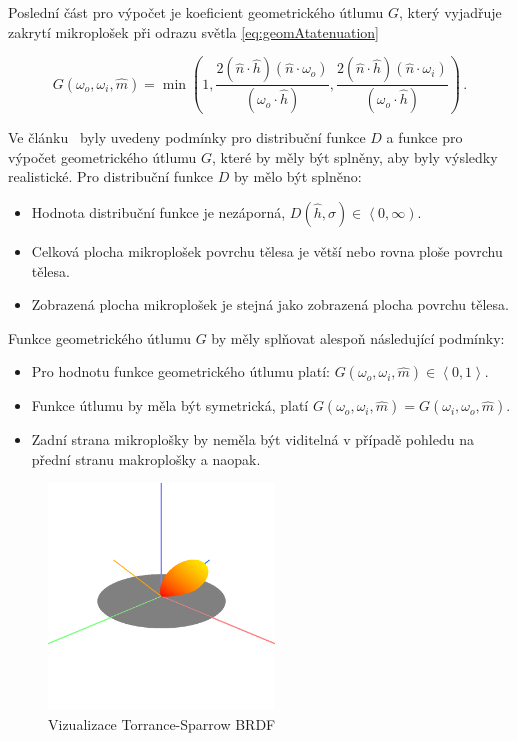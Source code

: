 \documentclass[czech,master]{diploma}
\newcommand{\intervalcc}[2]{\left<{{#1},{#2}}\right>}
\newcommand{\intervalco}[2]{\left<{{#1},{#2}}\right)}
\newcommand{\uvec}[1]{\hat{#1}}
\newcommand{\normVec}{\uvec{n}}
\newcommand{\normMicroVec}{\uvec{m}}
\newcommand{\inVec}{\omega_{i}}
\newcommand{\outVec}{\omega_{o}}
\newcommand{\halfVec}{\uvec{h}}
\newcommand{\rough}{\sigma}
\begin{document}
Poslední část pro výpočet je koeficient geometrického útlumu \(G\), který vyjadřuje zakrytí mikroplošek při odrazu světla \hyperref[eq:geomAtatenuation]{\ref{eq:geomAtatenuation}}~\cite{BRDFOverview}

\begin{equation}\label{eq:geomAtatenuation}
  G(\outVec,\inVec, \normMicroVec)  =  \min \left( 1, \frac{2 ( \normVec \cdot \halfVec ) ( \normVec \cdot \outVec )
    }{ ( \outVec \cdot \halfVec ) },\frac{ 2 ( \normVec \cdot \halfVec ) ( \normVec \cdot \inVec ) }{ ( \outVec \cdot \halfVec ) } \right)\,.
\end{equation}


Ve článku~\cite{MicrofacetWalter} byly uvedeny podmínky pro distribuční funkce \(D\) a funkce pro výpočet geometrického útlumu \(G\), které by měly být splněny, aby byly výsledky realistické. Pro distribuční funkce \(D\) by mělo být splněno:
\begin{itemize}
  \item Hodnota distribuční funkce je nezáporná, \(D(\halfVec,\rough) \in \intervalco{0}{\infty}\).
  \item Celková plocha mikroplošek povrchu tělesa je větší nebo rovna ploše povrchu tělesa.
  \item Zobrazená plocha mikroplošek je stejná jako zobrazená plocha povrchu tělesa.
\end{itemize}
Funkce geometrického útlumu \(G\) by měly splňovat alespoň následující podmínky:
\begin{itemize}
  \item Pro hodnotu funkce geometrického útlumu platí: \(G(\outVec, \inVec, \normMicroVec) \in \intervalcc{0}{1}\).
  \item Funkce útlumu by měla být symetrická, platí \(G(\outVec, \inVec, \normMicroVec) = G(\inVec, \outVec, \normMicroVec)\).
  \item Zadní strana mikroplošky by neměla být viditelná v případě pohledu na přední stranu makroplošky a naopak.
\end{itemize}

\begin{figure}[ht]%
  \centering\includegraphics[width=6cm]{Figures/visualizations/brdfTorranceSparrow.png}%
  \caption{Vizualizace Torrance-Sparrow BRDF}%
  \label{fig:torranceSparrowBRDFRender}%
\end{figure}
\end{document}
